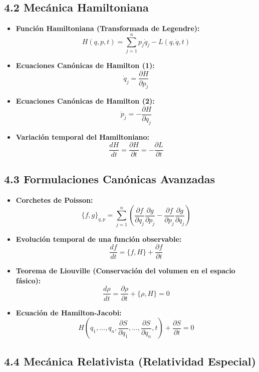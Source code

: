 \documentclass[11pt,a4paper]{article}
\begin{document}
\subsection*{4.2 Mecánica Hamiltoniana}

\begin{itemize}
  \item \textbf{Función Hamiltoniana (Transformada de Legendre):}
  \[
    H(q, p, t) = \sum_{j=1}^n p_j \dot{q}_j - L(q, \dot{q}, t)
  \]
  \item \textbf{Ecuaciones Canónicas de Hamilton (1):}
  \[
    \dot{q}_j = \frac{\partial H}{\partial p_j}
  \]
  \item \textbf{Ecuaciones Canónicas de Hamilton (2):}
  \[
    \dot{p}_j = -\frac{\partial H}{\partial q_j}
  \]
  \item \textbf{Variación temporal del Hamiltoniano:}
  \[
    \frac{dH}{dt} = \frac{\partial H}{\partial t} = -\frac{\partial L}{\partial t}
  \]
\end{itemize}

\subsection*{4.3 Formulaciones Canónicas Avanzadas}

\begin{itemize}
  \item \textbf{Corchetes de Poisson:}
  \[
    \{f, g\}_{q,p} = \sum_{j=1}^n \left( \frac{\partial f}{\partial q_j} \frac{\partial g}{\partial p_j} - \frac{\partial f}{\partial p_j} \frac{\partial g}{\partial q_j} \right)
  \]
  \item \textbf{Evolución temporal de una función observable:}
  \[
    \frac{df}{dt} = \{f, H\} + \frac{\partial f}{\partial t}
  \]
  \item \textbf{Teorema de Liouville (Conservación del volumen en el espacio fásico):}
  \[
    \frac{d\rho}{dt} = \frac{\partial \rho}{\partial t} + \{\rho, H\} = 0
  \]
  \item \textbf{Ecuación de Hamilton-Jacobi:}
  \[
    H\left( q_1, \dots, q_n, \frac{\partial S}{\partial q_1}, \dots, \frac{\partial S}{\partial q_n}, t \right) + \frac{\partial S}{\partial t} = 0
  \]
\end{itemize}

\subsection*{4.4 Mecánica Relativista (Relatividad Especial)}
\end{document}
